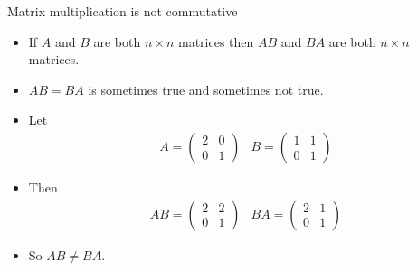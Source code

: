 \documentclass{beamer}
\begin{document}
\begin{frame}{Matrix multiplication is not commutative}

\begin{itemize}
\item If $A$ and $B$ are both $n\times n$ matrices then $A B$ and $B A$
are both $n\times n$ matrices.
\item $A B = B A$ is sometimes true and sometimes not true.
\item Let
$$
\begin{matrix}

A =

\begin{pmatrix}
2 & 0 \\
0 & 1
\end{pmatrix}

&

B =

\begin{pmatrix}
1 & 1 \\
0 & 1
\end{pmatrix}

\end{matrix}
$$

\item Then
$$
\begin{matrix}

AB =

\begin{pmatrix}
2 & 2 \\
0 & 1
\end{pmatrix}

&

BA =

\begin{pmatrix}
2 & 1 \\
0 & 1
\end{pmatrix}

\end{matrix}
$$
\item So $AB \not= BA$.

\end{itemize}

\end{frame}


\end{document}
